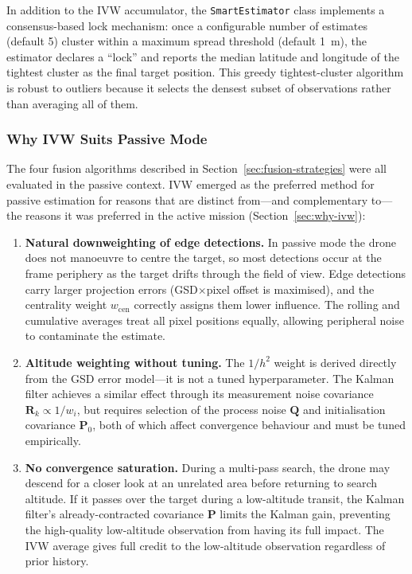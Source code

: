 \noindent In addition to the IVW accumulator, the \texttt{SmartEstimator} class implements a consensus-based lock mechanism: once a configurable number of estimates (default 5) cluster within a maximum spread threshold (default \SI{1}{\metre}), the estimator declares a ``lock'' and reports the median latitude and longitude of the tightest cluster as the final target position.  This greedy tightest-cluster algorithm is robust to outliers because it selects the densest subset of observations rather than averaging all of them.

\subsubsection{Why IVW Suits Passive Mode}\label{sec:ivw-passive}

The four fusion algorithms described in Section~\ref{sec:fusion-strategies} were all evaluated in the passive context.  IVW emerged as the preferred method for passive estimation for reasons that are distinct from---and complementary to---the reasons it was preferred in the active mission (Section~\ref{sec:why-ivw}):

\begin{enumerate}
  \item \textbf{Natural downweighting of edge detections.}  In passive mode the drone does not manoeuvre to centre the target, so most detections occur at the frame periphery as the target drifts through the field of view.  Edge detections carry larger projection errors (GSD$\times$pixel offset is maximised), and the centrality weight $w_\mathrm{cen}$ correctly assigns them lower influence.  The rolling and cumulative averages treat all pixel positions equally, allowing peripheral noise to contaminate the estimate.

  \item \textbf{Altitude weighting without tuning.}  The $1/h^2$ weight is derived directly from the GSD error model---it is not a tuned hyperparameter.  The Kalman filter achieves a similar effect through its measurement noise covariance $\mathbf{R}_k \propto 1/w_i$, but requires selection of the process noise $\mathbf{Q}$ and initialisation covariance $\mathbf{P}_0$, both of which affect convergence behaviour and must be tuned empirically.

  \item \textbf{No convergence saturation.}  During a multi-pass search, the drone may descend for a closer look at an unrelated area before returning to search altitude.  If it passes over the target during a low-altitude transit, the Kalman filter's already-contracted covariance $\mathbf{P}$ limits the Kalman gain, preventing the high-quality low-altitude observation from having its full impact.  The IVW average gives full credit to the low-altitude observation regardless of prior history.
\end{enumerate}

